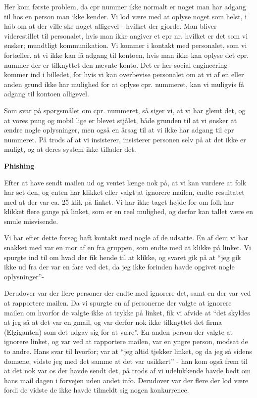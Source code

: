 \documentclass[11pt]{report}
\begin{document}
Her kom første problem, da cpr nummer ikke normalt er noget man har adgang til hos en person man ikke kender. Vi lod være med at oplyse noget som helst, i håb om at der ville ske noget alligevel - hvilket der gjorde. Man bliver viderestillet til personalet, hvis man ikke angiver et cpr nr. hvilket er det som vi ønsker; mundtligt kommunikation.
Vi kommer i kontakt med personalet, som vi fortæller, at vi ikke kan få adgang til kontoen, hvis man ikke kan oplyse det cpr. nummer der er tilknyttet den nævnte konto. Det er her social engineering kommer ind i billedet, for hvis vi kan overbevise personalet om at vi af en eller anden grund ikke har mulighed for at oplyse cpr. nummeret, kan vi muligvis få adgang til kontoen alligevel.
	
Som svar på spørgsmålet om cpr. nummeret, så siger vi, at vi har glemt det, og at vores pung og mobil lige er blevet stjålet, både grunden til at vi ønsker at ændre nogle oplysninger, men også en årsag til at vi ikke har adgang til cpr nummeret. På trods af at vi insisterer, insisterer personen selv på at det ikke er muligt, og at deres system ikke tillader det.

\noindent\textbf{Phishing}
\par Efter at have sendt mailen ud og ventet længe nok på, at vi kan vurdere at folk har set den, og enten har klikket eller valgt at ignorere mailen, endte resultatet med at der var ca. 25 klik på linket. Vi har ikke taget højde for om folk har klikket flere gange på linket, som er en reel mulighed, og derfor kan tallet være en smule misvisende.


Vi har efter dette forsøg haft kontakt med nogle af de udsatte. En af dem vi har snakket med var en mor af en fra gruppen, som endte med at klikke på linket. Vi spurgte ind til om hvad der fik hende til at klikke, og svaret gik på at “jeg gik ikke ud fra der var en fare ved det, da jeg ikke forinden havde opgivet nogle oplysninger”-


Derudover var der flere personer der endte med ignorere det, samt en der var ved at rapportere mailen. Da vi spurgte en af personerne der valgte at ignorere mailen om hvorfor de valgte ikke at trykke på linket, fik vi afvide at “det skyldes at jeg så at det var en gmail, og var derfor nok ikke tilknyttet det firma (Elgiganten) som det udgav sig for at være”. En anden person der valgte at ignorere linket, og var ved at rapportere mailen, var en yngre person, modsat de to andre. Hans svar til hvorfor; var at “jeg altid tjekker linket, og da jeg så sidens domæne, vidste jeg med det samme at det var usikkert” - han kom også frem til at det nok var os der havde sendt det, på trods af vi udelukkende havde bedt om hans mail dagen i forvejen uden andet info. Derudover var der flere der lod være fordi de vidste de ikke havde tilmeldt sig nogen konkurrence.
\end{document}
